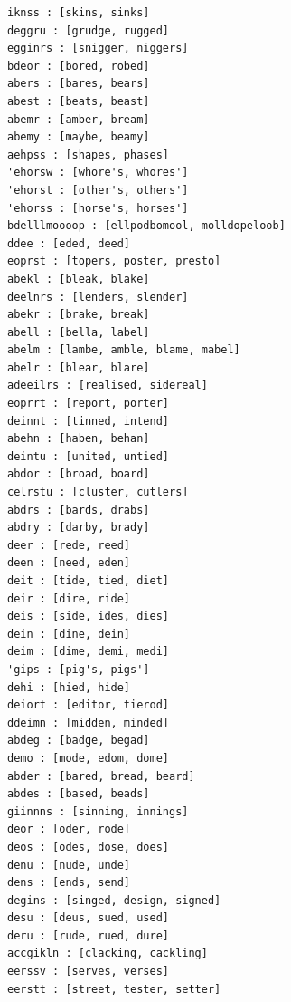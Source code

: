 \begin{verbatim}
iknss : [skins, sinks]
deggru : [grudge, rugged]
egginrs : [snigger, niggers]
bdeor : [bored, robed]
abers : [bares, bears]
abest : [beats, beast]
abemr : [amber, bream]
abemy : [maybe, beamy]
aehpss : [shapes, phases]
'ehorsw : [whore's, whores']
'ehorst : [other's, others']
'ehorss : [horse's, horses']
bdelllmoooop : [ellpodbomool, molldopeloob]
ddee : [eded, deed]
eoprst : [topers, poster, presto]
abekl : [bleak, blake]
deelnrs : [lenders, slender]
abekr : [brake, break]
abell : [bella, label]
abelm : [lambe, amble, blame, mabel]
abelr : [blear, blare]
adeeilrs : [realised, sidereal]
eoprrt : [report, porter]
deinnt : [tinned, intend]
abehn : [haben, behan]
deintu : [united, untied]
abdor : [broad, board]
celrstu : [cluster, cutlers]
abdrs : [bards, drabs]
abdry : [darby, brady]
deer : [rede, reed]
deen : [need, eden]
deit : [tide, tied, diet]
deir : [dire, ride]
deis : [side, ides, dies]
dein : [dine, dein]
deim : [dime, demi, medi]
'gips : [pig's, pigs']
dehi : [hied, hide]
deiort : [editor, tierod]
ddeimn : [midden, minded]
abdeg : [badge, begad]
demo : [mode, edom, dome]
abder : [bared, bread, beard]
abdes : [based, beads]
giinnns : [sinning, innings]
deor : [oder, rode]
deos : [odes, dose, does]
denu : [nude, unde]
dens : [ends, send]
degins : [singed, design, signed]
desu : [deus, sued, used]
deru : [rude, rued, dure]
accgikln : [clacking, cackling]
eerssv : [serves, verses]
eerstt : [street, tester, setter]
\end{verbatim}
